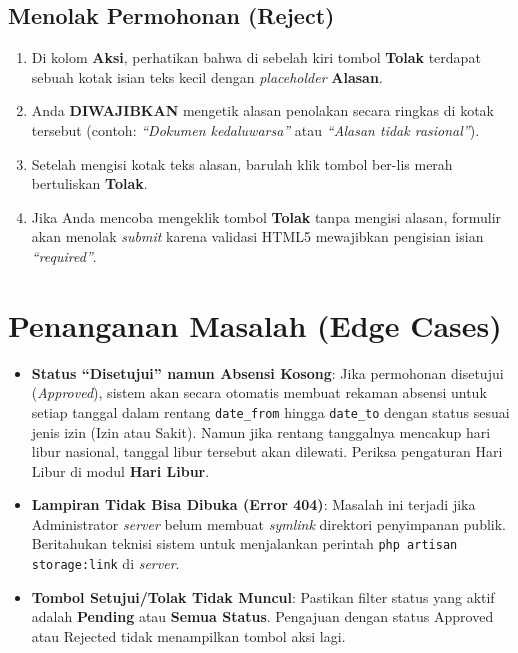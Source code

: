 \subsection{Menolak Permohonan (Reject)}
\begin{enumerate}
    \item Di kolom \textbf{Aksi}, perhatikan bahwa di sebelah kiri tombol \textbf{Tolak} terdapat sebuah kotak isian teks kecil dengan \textit{placeholder} \textbf{Alasan}.
    \item Anda \textbf{DIWAJIBKAN} mengetik alasan penolakan secara ringkas di kotak tersebut (contoh: \textit{``Dokumen kedaluwarsa''} atau \textit{``Alasan tidak rasional''}).
    \item Setelah mengisi kotak teks alasan, barulah klik tombol ber-lis merah bertuliskan \textbf{Tolak}.
    \item Jika Anda mencoba mengeklik tombol \textbf{Tolak} tanpa mengisi alasan, formulir akan menolak \textit{submit} karena validasi HTML5 mewajibkan pengisian isian \textit{``required''}.
\end{enumerate}

\section{Penanganan Masalah (Edge Cases)}
\begin{itemize}
    \item \textbf{Status ``Disetujui'' namun Absensi Kosong}: Jika permohonan disetujui (\textit{Approved}), sistem akan secara otomatis membuat rekaman absensi untuk setiap tanggal dalam rentang \texttt{date\_from} hingga \texttt{date\_to} dengan status sesuai jenis izin (Izin atau Sakit). Namun jika rentang tanggalnya mencakup hari libur nasional, tanggal libur tersebut akan dilewati. Periksa pengaturan Hari Libur di modul \textbf{Hari Libur}.
    \item \textbf{Lampiran Tidak Bisa Dibuka (Error 404)}: Masalah ini terjadi jika Administrator \textit{server} belum membuat \textit{symlink} direktori penyimpanan publik. Beritahukan teknisi sistem untuk menjalankan perintah \texttt{php artisan storage:link} di \textit{server}.
    \item \textbf{Tombol Setujui/Tolak Tidak Muncul}: Pastikan filter status yang aktif adalah \textbf{Pending} atau \textbf{Semua Status}. Pengajuan dengan status Approved atau Rejected tidak menampilkan tombol aksi lagi.
\end{itemize}
